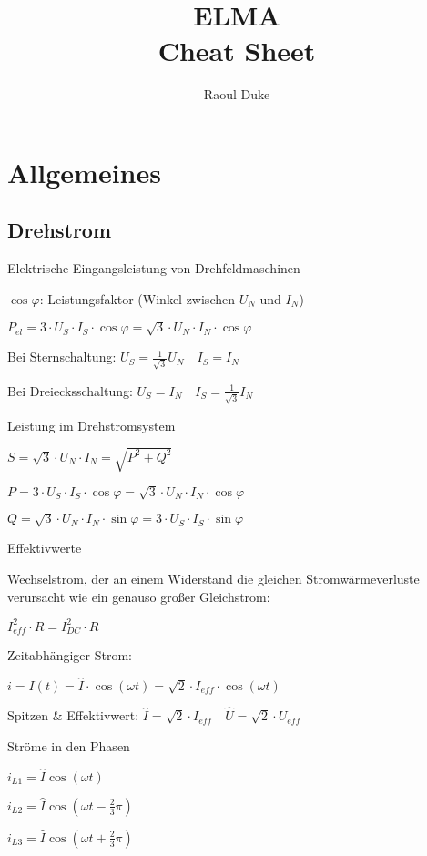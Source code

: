 \documentclass[german]{latex4ei/latex4ei_sheet}
\title{ELMA \\ Cheat Sheet}
\author{Raoul Duke}
\begin{document}
\maketitle   %

\section{Allgemeines}
	\begin{sectionbox}
		\subsection{Drehstrom}\label{Drehstrom}
			\begin{bluebox}{Elektrische Eingangsleistung von Drehfeldmaschinen}
				\item $\cos \varphi$: Leistungsfaktor (Winkel zwischen $U_N$ und  $I_N$)
				\item $P_{el} = 3 \cdot U_S \cdot I_S \cdot \cos \varphi  =  \sqrt{3}  \cdot U_N \cdot I_N \cdot \cos \varphi$
				\item Bei Sternschaltung: $U_S = \frac{1}{\sqrt{3}}U_N \quad I_S = I_N$
				\item Bei Dreiecksschaltung:  $U_S = I_N \quad I_S = \frac{1}{\sqrt{3}}I_N$
			\end{bluebox}


			\begin{symbolbox}{Leistung im Drehstromsystem}
				\item $S= \sqrt{3} \cdot U_N \cdot I_N = \sqrt{P^2 +Q^2}$
				\item $P = 3 \cdot U_S \cdot I_S \cdot \cos \varphi = \sqrt{3} \cdot U_N \cdot I_N \cdot \cos \varphi$
				\item $Q = \sqrt{3}\cdot U_N\cdot I_N \cdot \sin \varphi = 3\cdot U_S\cdot I_S\cdot \sin \varphi$
			\end{symbolbox}

			\begin{bluebox}{Effektivwerte}
				\item Wechselstrom, der an einem Widerstand die gleichen Stromwärmeverluste verursacht wie ein genauso großer Gleichstrom:
				\item $I^2_{eff}\cdot R = I^2_{DC}\cdot R$
				\item Zeitabhängiger Strom:
				\item $i = I(t) =  \hat{I} \cdot \cos(\omega t) = \sqrt{2}\cdot I_{eff}\cdot \cos(\omega t)$
				\item Spitzen \& Effektivwert: $\hat{I} = \sqrt{2}\cdot I_{eff}\quad \hat{U} = \sqrt{2}\cdot U_{eff}$
			\end{bluebox}
			\begin{symbolbox}{Ströme in den Phasen}
				\item $i_{L1}= \hat{I}\cos(\omega t)$
				\item $i_{L2}= \hat{I}\cos(\omega t-\frac{2}{3}\pi)$
				\item $i_{L3}= \hat{I}\cos(\omega t+\frac{2}{3}\pi)$
			\end{symbolbox}


\end{sectionbox}
\end{document}
